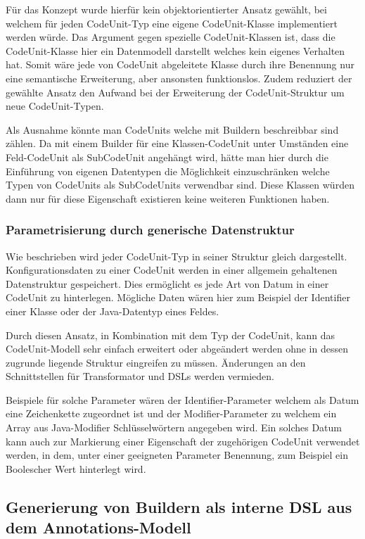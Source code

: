 \documentclass[12pt,oneside,a4paper,parskip]{scrbook}
\begin{document}
Für das Konzept wurde hierfür kein objektorientierter Ansatz gewählt, bei welchem für jeden CodeUnit-Typ eine eigene CodeUnit-Klasse implementiert werden würde. Das Argument gegen spezielle CodeUnit-Klassen ist, dass die CodeUnit-Klasse hier ein Datenmodell darstellt welches kein eigenes Verhalten hat. Somit wäre jede von CodeUnit abgeleitete Klasse durch ihre Benennung nur eine semantische Erweiterung, aber ansonsten funktionslos. Zudem reduziert der gewählte Ansatz den Aufwand bei der Erweiterung der CodeUnit-Struktur um neue CodeUnit-Typen.

Als Ausnahme könnte man CodeUnits welche mit Buildern beschreibbar sind zählen. Da mit einem Builder für eine Klassen-CodeUnit unter Umständen eine Feld-CodeUnit als SubCodeUnit angehängt wird, hätte man hier durch die Einführung von eigenen Datentypen die Möglichkeit einzuschränken welche Typen von CodeUnits als SubCodeUnits verwendbar sind. Diese Klassen würden dann nur für diese Eigenschaft existieren keine weiteren Funktionen haben.

\subsubsection{Parametrisierung durch generische Datenstruktur}

Wie beschrieben wird jeder CodeUnit-Typ in seiner Struktur gleich dargestellt. Konfigurationsdaten zu einer CodeUnit werden in einer allgemein gehaltenen Datenstruktur gespeichert. Dies ermöglicht es jede Art von Datum in einer CodeUnit zu hinterlegen. Mögliche Daten wären hier zum Beispiel der Identifier einer Klasse oder der Java-Datentyp eines Feldes.

Durch diesen Ansatz, in Kombination mit dem Typ der CodeUnit, kann das CodeUnit-Modell sehr einfach erweitert oder abgeändert werden ohne in dessen zugrunde liegende Struktur eingreifen zu müssen. Änderungen an den Schnittstellen für Transformator und DSLs werden vermieden.

Beispiele für solche Parameter wären der Identifier-Parameter welchem als Datum eine Zeichenkette zugeordnet ist und der Modifier-Parameter zu welchem ein Array aus Java-Modifier Schlüsselwörtern angegeben wird. Ein solches Datum kann auch zur Markierung einer Eigenschaft der zugehörigen CodeUnit verwendet werden, in dem, unter einer geeigneten Parameter Benennung, zum Beispiel ein Boolescher Wert hinterlegt wird.

\subsection{Generierung von Buildern als interne DSL aus dem Annotations-Modell}
\end{document}
